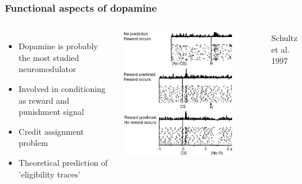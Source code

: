 \documentclass{beamer}
\begin{document}
\begin{frame}
\frametitle{Functional aspects of dopamine}
    \begin{columns}[T]
    

    \begin{itemize}
        \item Dopamine is probably the most studied neuromodulator
        \item Involved in conditioning as reward and punishment signal
        \item Credit assignment problem
        \item Theoretical prediction of 'eligibility traces'
    \end{itemize}

    \includegraphics[width=0.8\textwidth]{./figures/schultz_rpe}

    \tiny{Schultz et al. 1997}

  \end{columns}

\end{frame}
\end{document}
